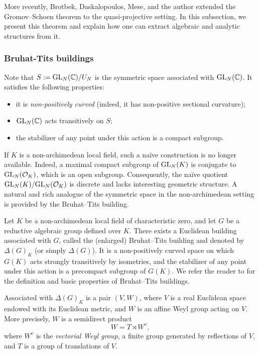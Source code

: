 \documentclass[english]{amsproc}
\theoremstyle{plain}
\theoremstyle{definition}
\theoremstyle{remark}
\theoremstyle{plain}
\numberwithin{equation}{thm} %
\newcommand{\GL}{{\rm GL}}
\begin{document}
More recently, Brotbek, Daskalopoulos, Mese, and the   author \cite{BDDM,DM24} extended the 
Gromov--Schoen theorem to the quasi-projective setting. 
In this subsection, we present this theorem and explain how one can extract algebraic and 
analytic structures from it.
\subsubsection{Bruhat-Tits buildings}  
Note that \(S:=\GL_N(\mathbb{C})/U_N\) is the symmetric space associated with \(\GL_N(\mathbb{C})\).
It satisfies the following properties:
\begin{itemize}
	\item it is \emph{non-positively curved} (indeed, it has non-positive sectional curvature);
	\item \(\GL_N(\mathbb{C})\) acts transitively on \(S\);
	\item the stabilizer of any point under this action is a compact subgroup.
\end{itemize}
If \(K\) is a non-archimedean local field, such a na\"ive construction is no longer available.
Indeed, a maximal compact subgroup of \(\GL_N(K)\) is conjugate to \(\GL_N(\mathcal{O}_K)\),
which is an open subgroup. Consequently, the na\"ive quotient
\(\GL_N(K)/\GL_N(\mathcal{O}_K)\) is discrete and lacks interesting geometric structure.
A natural and rich analogue of the symmetric space in the non-archimedean setting is provided
by the Bruhat--Tits building.

Let \(K\) be a non-archimedean local field of characteristic zero, and let \(G\) be a reductive 
algebraic group defined over \(K\). 
There exists a Euclidean building associated with \(G\), called the (enlarged) 
Bruhat--Tits building and denoted by \(\Delta(G)_K\) (or simply \(\Delta(G)\)). 
It is a non-positively curved space on which \(G(K)\) acts strongly transitively by isometries, 
and the stabilizer of any point under this action is a precompact subgroup of \(G(K)\). 
We refer the reader to \cite{KP23,Guy23} for the definition and basic properties of 
Bruhat--Tits buildings.

Associated with \(\Delta(G)_K\) is a pair \((V,W)\), where \(V\) is a real Euclidean space 
endowed with its Euclidean metric, and \(W\) is an affine Weyl group acting on \(V\). 
More precisely, \(W\) is a semidirect product
\[
W = T \rtimes W^{v},
\]
where \(W^{v}\) is the \emph{vectorial Weyl group}, a finite group generated by reflections of 
\(V\), and \(T\) is a group of translations of \(V\).
\end{document}
